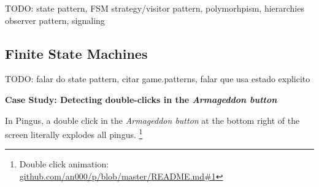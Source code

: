 \documentclass{vgtc}                          %
\begin{document}
TODO: state pattern, FSM
      strategy/visitor pattern, polymorhpism, hierarchies
      observer pattern, signaling

\subsection{Finite State Machines}

TODO: falar do state pattern, citar game.patterns, falar que usa estado explicito

\textbf{Case Study: Detecting double-clicks in the \emph{Armageddon button}}


In Pingus, a double click in the \emph{Armageddon button} at the bottom right
of the screen literally explodes all pingus.%
\footnote{Double click animation: \url{github.com/an000/p/blob/master/README.md#1} }
\end{document}
